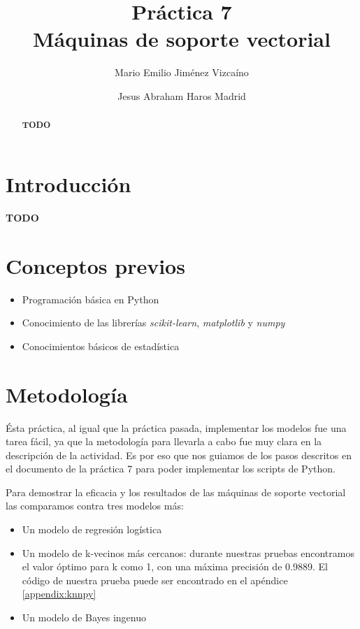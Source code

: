 \documentclass[sigconf,authorversion,nonacm]{acmart}
\begin{document}
\title{Práctica 7 \\ Máquinas de soporte vectorial}

\author{Mario Emilio Jiménez Vizcaíno}

\author{Jesus Abraham Haros Madrid}


\begin{abstract}
  \textbf{TODO}
\end{abstract}

\maketitle

\section{Introducción}
\textbf{TODO}


\section{Conceptos previos}
\begin{itemize}
  \item Programación básica en Python
  \item Conocimiento de las librerías \textit{scikit-learn}, \textit{matplotlib} y \textit{numpy}
  \item Conocimientos básicos de estadística
\end{itemize}


\section{Metodología}
Ésta práctica, al igual que la práctica pasada, implementar los modelos fue una tarea fácil, ya que la metodología para llevarla a cabo fue muy clara en la descripción de la actividad. Es por eso que nos guiamos de los pasos descritos en el documento de la práctica 7 para poder implementar los scripts de Python.

Para demostrar la eficacia y los resultados de las máquinas de soporte vectorial las comparamos contra tres modelos más:
\begin{itemize}
  \item Un modelo de regresión logística
  \item Un modelo de k-vecinos más cercanos: durante nuestras pruebas encontramos el valor óptimo para k como 1, con una máxima precisión de 0.9889. El código de nuestra prueba puede ser encontrado en el apéndice \ref{appendix:knnpy}
  \item Un modelo de Bayes ingenuo
\end{itemize}
\end{document}
